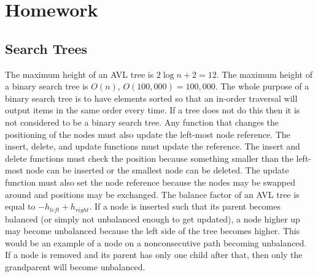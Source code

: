 \section{Homework}
\subsection{Search Trees}
The maximum height of an AVL tree is $2\log n + 2=12$.  The maximum height of a binary search tree is $O(n)$, $O(100,000)=100,000$.
The whole purpose of a binary search tree is to have elements sorted so that an in-order traversal will output items in the same order every time.  If a tree does not do this then it is not considered to be a binary search tree.
Any function that changes the positioning of the nodes must also update the left-most node reference.  The insert, delete, and update functions must update the reference.  The insert and delete functions must check the position because something smaller than the left-most node can be inserted or the smallest node can be deleted.  The update function must also set the node reference because the nodes may be swapped around and positions may be exchanged.
The balance factor of an AVL tree is equal to $-h_{left} + h_{right}$.  If a node is inserted such that its parent becomes balanced (or simply not unbalanced enough to get updated), a node higher up may become unbalanced because the left side of the tree becomes higher.  This would be an example of a node on a nonconsecutive path becoming unbalanced.  If a node is removed and its parent has only one child after that, then only the grandparent will become unbalanced.
